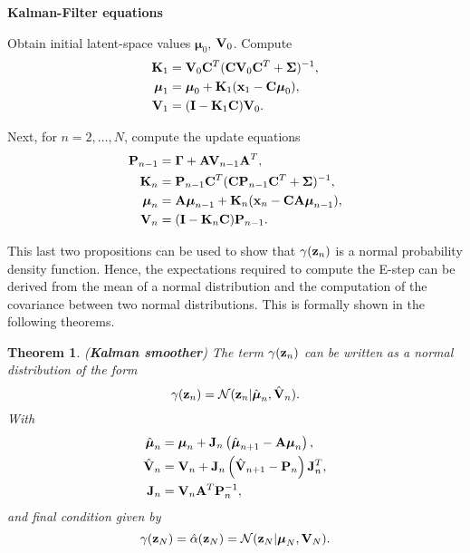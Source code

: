 \documentclass[11pt]{article}
\numberwithin{equation}{section}
\newcommand{\x}{{\bf x}}
\newcommand{\z}{{\bf z}}
\newcommand{\N}{\mathcal{N}}
\newtheorem{theorem}{Theorem}[section]
\begin{document}
\begin{tcolorbox}
\textbf{Kalman-Filter equations}

	Obtain initial latent-space values $\boldsymbol{\mu}_0$, ${\bf V}_0$. Compute
	\begin{align}
		{\bf K}_1 &= {\bf V}_0{\bf C}^T({\bf C} {\bf V}_0 {\bf C}^T + \boldsymbol\Sigma)^{-1},\\
		\boldsymbol{\mu}_1 &= \boldsymbol{\mu}_0 + {\bf K}_1(\x_1 -{\bf C}\boldsymbol\mu_0),\\
		{\bf V}_1 &=  ({\bf I} - {\bf K}_1{\bf C}){\bf V}_0.
	\end{align}

	Next, for $n=2, \ldots, N$, compute the update equations
	\begin{align}
		{\bf P}_{n-1} &= \boldsymbol{\Gamma} + {\bf A}{\bf V}_{n-1}{\bf A}^T,\\
		{\bf K}_n &= {\bf P}_{n-1}{\bf C}^T({\bf C} {\bf P}_{n-1}{\bf C}^T + \boldsymbol\Sigma)^{-1},\\
		\boldsymbol{\mu}_n &= {\bf A}\boldsymbol{\mu}_{n-1} + {\bf K}_n(\x_n -{\bf C}{\bf A}\boldsymbol\mu_{n-1}),\\
		{\bf V}_n &=  ({\bf I} - {\bf K}_n{\bf C}){\bf P}_{n-1}.
	\end{align}
\end{tcolorbox}

This last two propositions can be used to show that $\gamma(\z_n)$ is a normal probability density function. Hence, the expectations required to compute the E-step can be derived from the mean of a normal distribution and the computation of the covariance between two normal distributions. This is formally shown in the following theorems.


\begin{theorem} (\textbf{Kalman smoother}) \label{theorem:kalman-smoother}
	The term $\gamma(\z_n)$ can be written as a normal distribution of the form
	\begin{equation}
		\gamma(\z_n) = \N(\z_n\vert \hat{\boldsymbol\mu}_n, \hat{\bf V}_n).
	\end{equation}
	With
	\begin{align}
		\hat{\boldsymbol{\mu}}_n &= \boldsymbol{\mu}_n + {\bf J}_n\left(\hat{\boldsymbol \mu}_{n+1} - {\bf A}\boldsymbol\mu_n\right),\\
		\hat{\bf V}_n &= {\bf V}_n + {\bf J}_n\left(\hat{\bf V}_{n+1} - {\bf P}_n\right){\bf J}_n^T,\\
		{\bf J}_n &= {\bf V}_n{\bf A}^T{\bf P}_n^{-1},
	\end{align}
	and final condition given by
	\begin{equation}
		\gamma(\z_N) = \hat\alpha(\z_N) = \N(\z_N\vert \boldsymbol\mu_N, {\bf V}_N).
	\end{equation}
\end{theorem}
\end{document}
